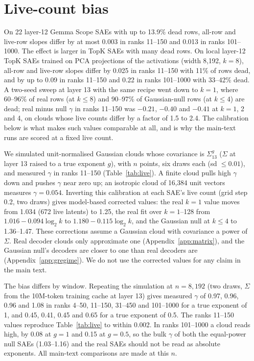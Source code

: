 \documentclass{article}
\newcommand{\Sig}{\Sigma}
\begin{document}
\section{Live-count bias}
\label{app:live}

On 22 layer-12 Gemma Scope SAEs with up to 13.9\% dead rows, all-row and live-row slopes differ by at most 0.003 in ranks 11--150 and 0.013 in ranks 101--1000. The effect is larger in TopK SAEs with many dead rows. On local layer-12 TopK SAEs trained on PCA projections of the activations (width 8,192, $k=8$), all-row and live-row slopes differ by 0.025 in ranks 11--150 with 11\% of rows dead, and by up to 0.09 in ranks 11--150 and 0.22 in ranks 101--1000 with 33--42\% dead. A two-seed sweep at layer 13 with the same recipe went down to $k=1$, where 60--96\% of real rows (at $k \le 8$) and 90--97\% of Gaussian-null rows (at $k \le 4$) are dead; real minus null $\gamma$ in ranks 11--150 was $-0.21$, $-0.40$ and $-0.41$ at $k=1$, 2 and 4, on clouds whose live counts differ by a factor of 1.5 to 2.4. The calibration below is what makes such values comparable at all, and is why the main-text runs are scored at a fixed live count.

We simulated unit-normalised Gaussian clouds whose covariance is $\Sig_{13}^{g}$ ($\Sig$ at layer 13 raised to a true exponent $g$), with $n$ points, six draws each (sd $\le 0.01$), and measured $\gamma$ in ranks 11--150 (Table~\ref{tab:live}). A finite cloud pulls high $\gamma$ down and pushes $\gamma$ near zero up; an isotropic cloud of 16,384 unit vectors measures $\gamma=0.054$. Inverting this calibration at each SAE's live count (grid step 0.2, two draws) gives model-based corrected values: the real $k=1$ value moves from 1.034 (672 live latents) to 1.25, the real fit over $k=1$--128 from $1.016-0.094\log_2 k$ to $1.180-0.115\log_2 k$, and the Gaussian null at $k \le 4$ to 1.36--1.47. These corrections assume a Gaussian cloud with covariance a power of $\Sig$. Real decoder clouds only approximate one (Appendix~\ref{app:matrix}), and the Gaussian null's decoders are closer to one than real decoders are (Appendix~\ref{app:gregime}). We do not use the corrected values for any claim in the main text.

The bias differs by window. Repeating the simulation at $n=8{,}192$ (two draws, $\Sig$ from the 10M-token training cache at layer 13) gives measured $\gamma$ of 0.97, 0.96, 0.96 and 1.08 in ranks 4--50, 11--150, 31--450 and 101--1000 for a true exponent of 1, and 0.45, 0.41, 0.45 and 0.65 for a true exponent of 0.5. The ranks 11--150 values reproduce Table~\ref{tab:live} to within 0.002. In ranks 101--1000 a cloud reads high, by 0.08 at $g=1$ and 0.15 at $g=0.5$, so the bulk $\gamma$ of both the equal-power null SAEs (1.03--1.16) and the real SAEs should not be read as absolute exponents. All main-text comparisons are made at this $n$.
\end{document}
